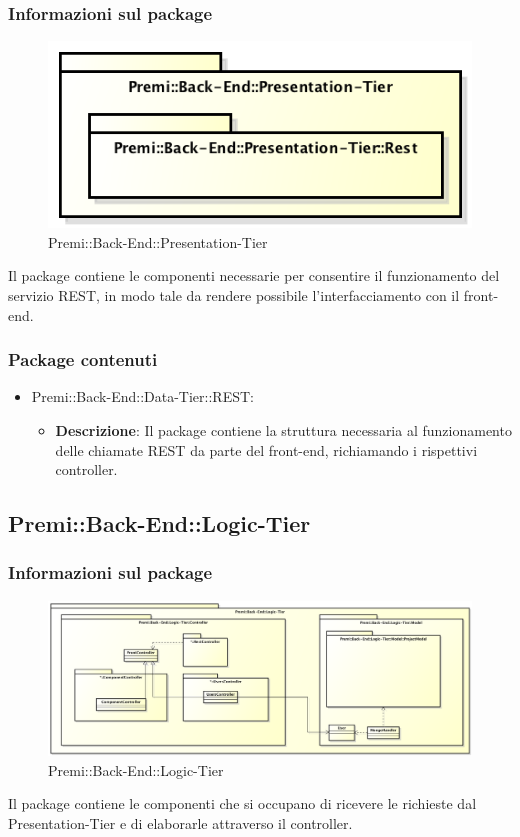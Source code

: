 	\subsubsection*{Informazioni sul package}
		\begin{figure}[h]
			\centering
			\includegraphics[width=0.5\linewidth]{img/back-end_presentation-tier}
			\caption[Premi::Back-End::Presentation-Tier]{Premi::Back-End::Presentation-Tier}
		\end{figure}
		Il package contiene le componenti necessarie per consentire il funzionamento del servizio REST, in modo tale da rendere possibile l'interfacciamento con il front-end.
		
	\subsubsection*{Package contenuti}
		\begin{itemize}
			\item Premi::Back-End::Data-Tier::REST:
			\begin{itemize}
				\item \textbf{Descrizione}: Il package contiene la struttura necessaria al funzionamento delle chiamate REST da parte del front-end, richiamando i rispettivi controller.
			\end{itemize}
		\end{itemize}
		
		
\subsection{Premi::Back-End::Logic-Tier}
	\subsubsection*{Informazioni sul package}
	\begin{figure}[h]
		\centering
		\includegraphics[width=0.9\linewidth]{img/back-end_logic-tier}
		\caption[Premi::Back-End::Logic-Tier]{Premi::Back-End::Logic-Tier}
	\end{figure}
	Il package contiene le componenti che si occupano di ricevere le richieste dal Presentation-Tier e di elaborarle attraverso il controller.
	
